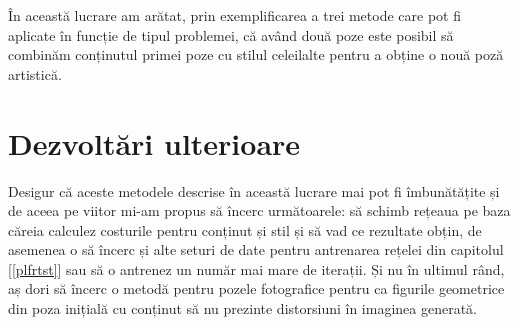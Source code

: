 În această lucrare am arătat, prin exemplificarea a trei metode care pot fi aplicate în funcție de tipul problemei, că având două poze este posibil să combinăm conținutul primei poze cu stilul celeilalte pentru a obține o nouă poză artistică.

\section{Dezvoltări ulterioare}
Desigur că aceste metodele descrise în această lucrare mai pot fi îmbunătățite și de aceea pe viitor mi-am propus să încerc următoarele: să schimb rețeaua pe baza căreia calculez costurile pentru conținut și stil și să vad ce rezultate obțin, de asemenea o să încerc și alte seturi de date pentru antrenarea rețelei din capitolul [\ref{plfrtst}] sau să o antrenez un număr mai mare de iterații. Și nu în ultimul rând, aș dori să încerc o metodă pentru pozele fotografice pentru ca figurile geometrice din poza inițială cu conținut să nu prezinte distorsiuni în imaginea generată.